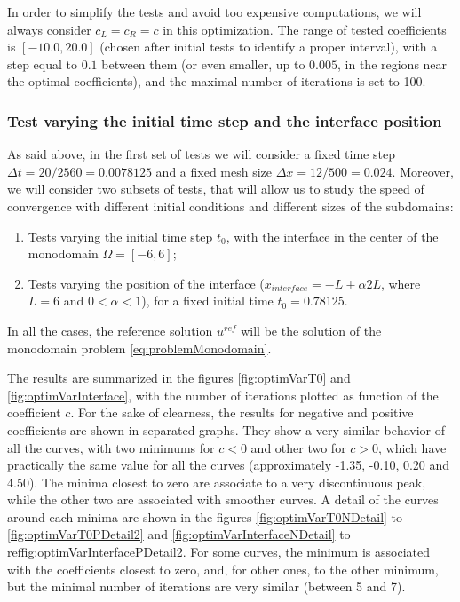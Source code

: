\indent In order to simplify the tests and avoid too expensive computations, we will always consider $c_L = c_R = c$ in this optimization. The range of tested coefficients is $[-10.0, 20.0]$ (chosen after initial tests to identify a proper interval), with a step equal to  $0.1$ between them (or even smaller, up to $0.005$, in the regions near the optimal coefficients), and the maximal number of iterations is set to 100.

\subsubsection{Test varying the initial time step and the interface position}

\indent As said above, in the first set of tests we will consider a fixed time step $\Delta t = 20/2560 = 0.0078125$ and a fixed mesh size $\Delta x = 12/500 = 0.024$. Moreover, we will consider two subsets of tests, that will allow us to study the speed of convergence with different initial conditions and different sizes of the subdomains:

\begin{enumerate}
	\item Tests varying the initial time step $t_0$, with the interface in the center of the monodomain $\Omega = [-6,6]$;
	\item Tests varying the position of the interface ($x_{interface} = -L + \alpha 2L$, where $L = 6$ and $0 < \alpha < 1$), for a fixed initial time $t_0 = 0.78125$.
\end{enumerate}

\indent In all the cases, the reference solution $u^{ref}$ will be the solution of the monodomain problem \eqref{eq:problemMonodomain}.

\indent The results are summarized in the figures \ref{fig:optimVarT0} and \ref{fig:optimVarInterface}, with the number of iterations plotted as function of the coefficient $c$. For the sake of clearness, the results for negative and positive coefficients are shown in separated graphs. They show a very similar behavior of all the curves, with two minimums for $c < 0$ and other two for $c>0$, which have practically the same value for all the curves (approximately -1.35, -0.10, 0.20 and 4.50). The minima closest to zero are associate to a very discontinuous peak, while the other two are associated with smoother curves. A detail of the curves around each minima are shown in the figures \ref{fig:optimVarT0NDetail} to \ref{fig:optimVarT0PDetail2} and \ref{fig:optimVarInterfaceNDetail} to ref{fig:optimVarInterfacePDetail2}. For some curves, the minimum is associated with the coefficients closest to zero, and, for other ones, to the other minimum, but the minimal number of iterations are very similar (between 5 and 7).

